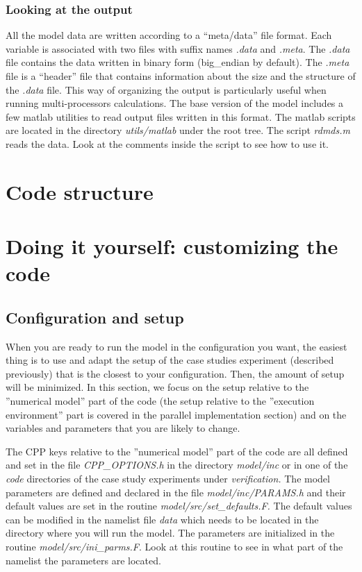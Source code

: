 \subsubsection{Looking at the output}

All the model data are written according to a ``meta/data'' file format.
Each variable is associated with two files with suffix names \textit{.data}
and \textit{.meta}. The \textit{.data} file contains the data written in
binary form (big\_endian by default). The \textit{.meta} file is a
``header'' file that contains information about the size and the structure
of the \textit{.data} file. This way of organizing the output is
particularly useful when running multi-processors calculations. The base
version of the model includes a few matlab utilities to read output files
written in this format. The matlab scripts are located in the directory 
\textit{utils/matlab} under the root tree. The script \textit{rdmds.m} reads
the data. Look at the comments inside the script to see how to use it.

\section{Code structure}

\section{Doing it yourself: customizing the code}

\subsection{\protect\bigskip Configuration and setup}

When you are ready to run the model in the configuration you want, the
easiest thing is to use and adapt the setup of the case studies experiment
(described previously) that is the closest to your configuration. Then, the
amount of setup will be minimized. In this section, we focus on the setup
relative to the ''numerical model'' part of the code (the setup relative to
the ''execution environment'' part is covered in the parallel implementation
section) and on the variables and parameters that you are likely to change.

The CPP keys relative to the ''numerical model'' part of the code are all
defined and set in the file \textit{CPP\_OPTIONS.h }in the directory \textit{%
model/inc }or in one of the \textit{code }directories of the case study
experiments under \textit{verification.} The model parameters are defined
and declared in the file \textit{model/inc/PARAMS.h }and their default
values are set in the routine \textit{model/src/set\_defaults.F. }The
default values can be modified in the namelist file \textit{data }which
needs to be located in the directory where you will run the model. The
parameters are initialized in the routine \textit{model/src/ini\_parms.F}.
Look at this routine to see in what part of the namelist the parameters are
located.

